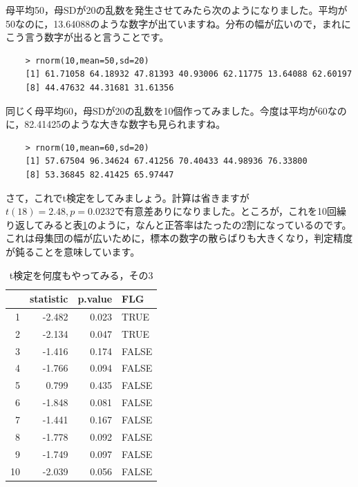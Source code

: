 \documentclass{ltjsarticle}
\begin{document}
母平均50，母SDが20の乱数を発生させてみたら次のようになりました。平均が50なのに，13.64088のような数字が出ていますね。分布の幅が広いので，まれにこう言う数字が出ると言うことです。
\begin{tcolorbox}
    \begin{verbatim}
    > rnorm(10,mean=50,sd=20)
    [1] 61.71058 64.18932 47.81393 40.93006 62.11775 13.64088 62.60197
    [8] 44.47632 44.31681 31.61356\end{verbatim}
\end{tcolorbox}

同じく母平均60，母SDが20の乱数を10個作ってみました。今度は平均が60なのに，82.41425のような大きな数字も見られますね。
\begin{tcolorbox}
    \begin{verbatim}
    > rnorm(10,mean=60,sd=20)
    [1] 57.67504 96.34624 67.41256 70.40433 44.98936 76.33800
    [8] 53.36845 82.41425 65.97447\end{verbatim}
\end{tcolorbox}

さて，これでt検定をしてみましょう。計算は省きますが$t(18)=2.48,p=0.0232$で有意差ありになりました。ところが，これを10回繰り返してみると表\ref{tbl::19_05}のように，なんと正答率はたったの2割になっているのです。これは母集団の幅が広いために，標本の数字の散らばりも大きくなり，判定精度が鈍ることを意味しています。

\begin{table}[ht]
    \centering
    \caption{t検定を何度もやってみる，その3} 
    \begin{tabular}{rrrl}
      \hline
     & statistic & p.value & FLG \\ 
      \hline
    1 & -2.482 & 0.023 & TRUE \\ 
      2 & -2.134 & 0.047 & TRUE \\ 
      3 & -1.416 & 0.174 & FALSE \\ 
      4 & -1.766 & 0.094 & FALSE \\ 
      5 & 0.799 & 0.435 & FALSE \\ 
      6 & -1.848 & 0.081 & FALSE \\ 
      7 & -1.441 & 0.167 & FALSE \\ 
      8 & -1.778 & 0.092 & FALSE \\ 
      9 & -1.749 & 0.097 & FALSE \\ 
      10 & -2.039 & 0.056 & FALSE \\ 
       \hline
    \end{tabular}
    \label{tbl::19_05}
    \end{table}
\end{document}
